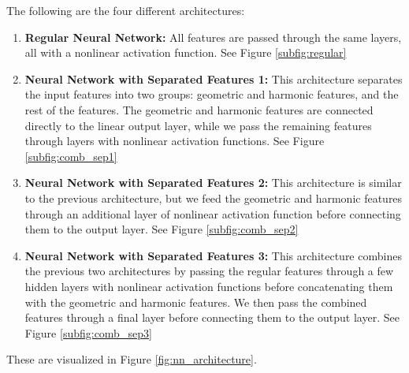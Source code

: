 The following are the four different architectures:
\begin{enumerate}
    \item \textbf{Regular Neural Network:} All features are passed through the same layers, all with a nonlinear activation function.
    See Figure \ref{subfig:regular}
    \item \textbf{Neural Network with Separated Features 1:} This architecture separates the input features into two groups: geometric and harmonic features, and the rest of the features.
    The geometric and harmonic features are connected directly to the linear output layer, while we pass the remaining features through layers with nonlinear activation functions.
    See Figure \ref{subfig:comb_sep1}
    \item \textbf{Neural Network with Separated Features 2:} This architecture is similar to the previous architecture,
    but we feed the geometric and harmonic features through an additional layer of nonlinear activation function before connecting them to the output layer.
    See Figure \ref{subfig:comb_sep2}
    \item \textbf{Neural Network with Separated Features 3:} This architecture combines the previous two architectures by passing the regular features through a few hidden layers with nonlinear activation functions before concatenating them with the geometric and harmonic features.
    We then pass the combined features through a final layer before connecting them to the output layer.
    See Figure \ref{subfig:comb_sep3}
\end{enumerate}
These are visualized in Figure \ref{fig:nn_architecture}.

